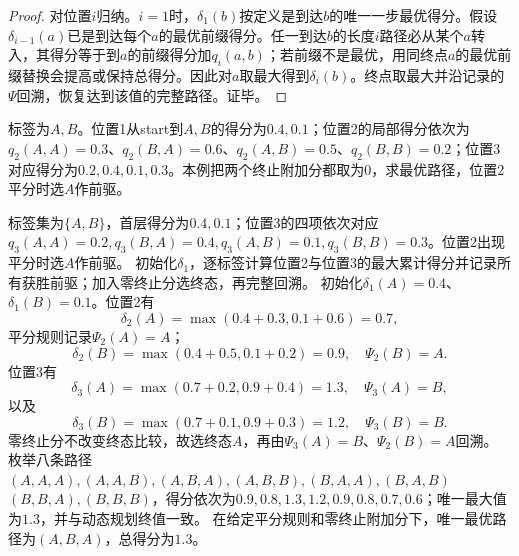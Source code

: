 \begin{proof}
对位置$i$归纳。$i=1$时，$\delta_1(b)$按定义是到达$b$的唯一一步最优得分。假设$\delta_{i-1}(a)$已是到达每个$a$的最优前缀得分。任一到达$b$的长度$i$路径必从某个$a$转入，其得分等于到$a$的前缀得分加$q_i(a,b)$；若前缀不是最优，用同终点$a$的最优前缀替换会提高或保持总得分。因此对$a$取最大得到$\delta_i(b)$。终点取最大并沿记录的$\Psi$回溯，恢复达到该值的完整路径。证毕。
\end{proof}


\label{struct:V3-C06-CH18}
\label{struct:V3-C06-CH32}
\begin{example}[手工执行三步Viterbi]\label{exm:V3-C06-viterbi}
标签为$A,B$。位置1从start到$A,B$的得分为$0.4,0.1$；位置2的局部得分依次为$q_2(A,A)=0.3$、$q_2(B,A)=0.6$、$q_2(A,B)=0.5$、$q_2(B,B)=0.2$；位置3对应得分为$0.2,0.4,0.1,0.3$。本例把两个终止附加分都取为0，求最优路径，位置2平分时选$A$作前驱。

\label{struct:V3-C06-CH33}
\end{example}
\begin{solution}
\SolGiven 标签集为$\{A,B\}$，首层得分为$0.4,0.1$；位置3的四项依次对应$q_3(A,A)=0.2,q_3(B,A)=0.4,q_3(A,B)=0.1,q_3(B,B)=0.3$。位置2出现平分时选$A$作前驱。
\SolPlan 初始化$\delta_1$，逐标签计算位置2与位置3的最大累计得分并记录所有获胜前驱；加入零终止分选终态，再完整回溯。
\SolDerive
初始化$\delta_1(A)=0.4$、$\delta_1(B)=0.1$。位置2有
\[
\delta_2(A)=\max(0.4+0.3,0.1+0.6)=0.7,
\]
平分规则记录$\Psi_2(A)=A$；
\[
\delta_2(B)=\max(0.4+0.5,0.1+0.2)=0.9,
\quad\Psi_2(B)=A.
\]
位置3有
\[
\delta_3(A)=\max(0.7+0.2,0.9+0.4)=1.3,
\quad\Psi_3(A)=B,
\]
以及
\[
\delta_3(B)=\max(0.7+0.1,0.9+0.3)=1.2,
\quad\Psi_3(B)=B.
\]
零终止分不改变终态比较，故选终态$A$，再由$\Psi_3(A)=B$、$\Psi_2(B)=A$回溯。
\SolCheck 枚举八条路径$(A,A,A),(A,A,B),(A,B,A),(A,B,B),(B,A,A),(B,A,B)$\newline$(B,B,A),(B,B,B)$，得分依次为$0.9,0.8,1.3,1.2,0.9,0.8,0.7,0.6$；唯一最大值为$1.3$，并与动态规划终值一致。
\SolAnswer 在给定平分规则和零终止附加分下，唯一最优路径为$(A,B,A)$，总得分为$1.3$。
\end{solution}

